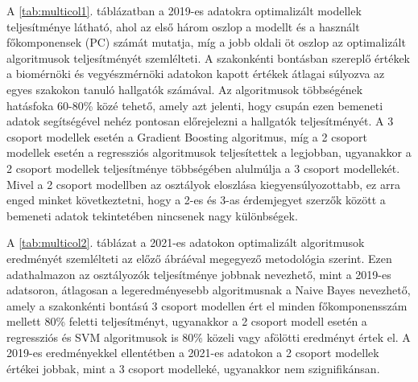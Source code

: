 \documentclass[12pt]{article}
\begin{document}
A \ref{tab:multicol1}. táblázatban a 2019-es adatokra optimalizált modellek teljesítménye látható, ahol az első három oszlop a modellt és a használt főkomponensek (PC) számát mutatja, míg a jobb oldali öt oszlop az optimalizált algoritmusok teljesítményét szemlélteti. A szakonkénti bontásban szereplő értékek a biomérnöki és vegyészmérnöki adatokon kapott értékek átlagai súlyozva az egyes szakokon tanuló hallgatók számával. Az algoritmusok többségének hatásfoka 60-80\% közé tehető, amely azt jelenti, hogy csupán ezen bemeneti adatok segítségével nehéz pontosan előrejelezni a hallgatók teljesítményét. A 3 csoport modellek esetén a Gradient Boosting algoritmus, míg a 2 csoport modellek esetén a regressziós algoritmusok teljesítettek a legjobban, ugyanakkor a 2 csoport modellek teljesítménye többségében alulmúlja a 3 csoport modellekét. Mivel a 2 csoport modellben az osztályok eloszlása kiegyensúlyozottabb, ez arra enged minket következtetni, hogy a 2-es és 3-as érdemjegyet szerzők között a bemeneti adatok tekintetében nincsenek nagy különbségek.

A \ref{tab:multicol2}. táblázat a 2021-es adatokon optimalizált algoritmusok eredményét szemlélteti az előző ábráéval megegyező metodológia szerint. Ezen adathalmazon az osztályozók teljesítménye jobbnak nevezhető, mint a 2019-es adatsoron, átlagosan a legeredményesebb algoritmusnak a Naive Bayes nevezhető, amely a szakonkénti bontású 3 csoport modellen ért el minden főkomponensszám mellett 80\% feletti teljesítményt, ugyanakkor a 2 csoport modell esetén a regressziós és SVM algoritmusok is 80\% közeli vagy afölötti eredményt értek el. A 2019-es eredményekkel ellentétben a 2021-es adatokon a 2 csoport modellek értékei jobbak, mint a 3 csoport modelleké, ugyanakkor nem szignifikánsan.
\end{document}
